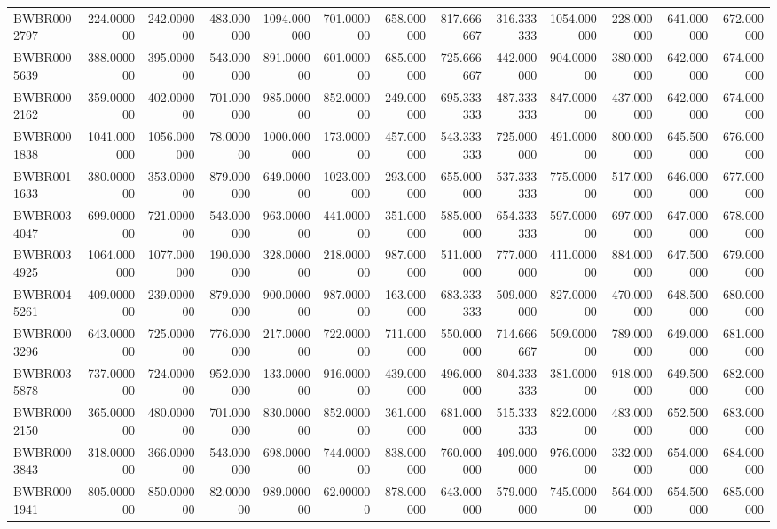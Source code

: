 \begin{longtable}{lrrrrrrrrrrrr}
BWBR0002797 & 224.000000 & 242.000000 & 483.000000 & 1094.000000 & 701.000000 & 658.000000 & 817.666667 & 316.333333 & 1054.000000 & 228.000000 & 641.000000 & 672.000000 \\
BWBR0005639 & 388.000000 & 395.000000 & 543.000000 & 891.000000 & 601.000000 & 685.000000 & 725.666667 & 442.000000 & 904.000000 & 380.000000 & 642.000000 & 674.000000 \\
BWBR0002162 & 359.000000 & 402.000000 & 701.000000 & 985.000000 & 852.000000 & 249.000000 & 695.333333 & 487.333333 & 847.000000 & 437.000000 & 642.000000 & 674.000000 \\
BWBR0001838 & 1041.000000 & 1056.000000 & 78.000000 & 1000.000000 & 173.000000 & 457.000000 & 543.333333 & 725.000000 & 491.000000 & 800.000000 & 645.500000 & 676.000000 \\
BWBR0011633 & 380.000000 & 353.000000 & 879.000000 & 649.000000 & 1023.000000 & 293.000000 & 655.000000 & 537.333333 & 775.000000 & 517.000000 & 646.000000 & 677.000000 \\
BWBR0034047 & 699.000000 & 721.000000 & 543.000000 & 963.000000 & 441.000000 & 351.000000 & 585.000000 & 654.333333 & 597.000000 & 697.000000 & 647.000000 & 678.000000 \\
BWBR0034925 & 1064.000000 & 1077.000000 & 190.000000 & 328.000000 & 218.000000 & 987.000000 & 511.000000 & 777.000000 & 411.000000 & 884.000000 & 647.500000 & 679.000000 \\
BWBR0045261 & 409.000000 & 239.000000 & 879.000000 & 900.000000 & 987.000000 & 163.000000 & 683.333333 & 509.000000 & 827.000000 & 470.000000 & 648.500000 & 680.000000 \\
BWBR0003296 & 643.000000 & 725.000000 & 776.000000 & 217.000000 & 722.000000 & 711.000000 & 550.000000 & 714.666667 & 509.000000 & 789.000000 & 649.000000 & 681.000000 \\
BWBR0035878 & 737.000000 & 724.000000 & 952.000000 & 133.000000 & 916.000000 & 439.000000 & 496.000000 & 804.333333 & 381.000000 & 918.000000 & 649.500000 & 682.000000 \\
BWBR0002150 & 365.000000 & 480.000000 & 701.000000 & 830.000000 & 852.000000 & 361.000000 & 681.000000 & 515.333333 & 822.000000 & 483.000000 & 652.500000 & 683.000000 \\
BWBR0003843 & 318.000000 & 366.000000 & 543.000000 & 698.000000 & 744.000000 & 838.000000 & 760.000000 & 409.000000 & 976.000000 & 332.000000 & 654.000000 & 684.000000 \\
BWBR0001941 & 805.000000 & 850.000000 & 82.000000 & 989.000000 & 62.000000 & 878.000000 & 643.000000 & 579.000000 & 745.000000 & 564.000000 & 654.500000 & 685.000000 \\

\end{longtable}
